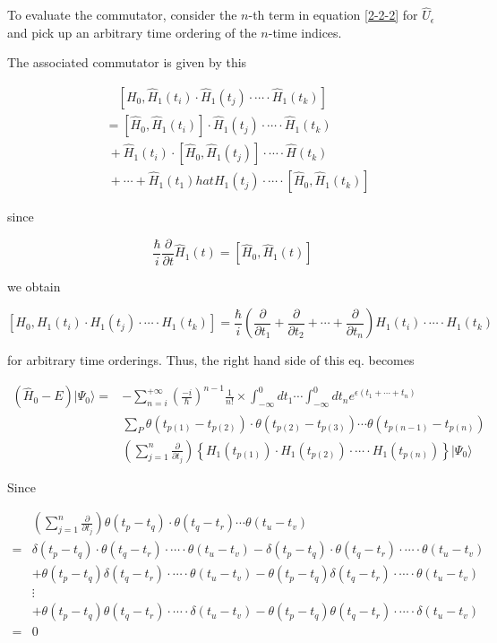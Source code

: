 To evaluate the commutator, consider the $n$-th term in equation \eqref{2-2-2} for $\hat{U}_\epsilon$ and pick up an arbitrary time ordering of the $n$-time indices. 

The associated commutator is given by this

\[\begin{split}
&\quad[H_0,\hat{H}_1(t_i)\cdot\hat{H}_1(t_j)\cdot\cdots\cdot\hat{H}_1(t_k)]\\
&=[\hat{H}_0,\hat{H}_1(t_i)]\cdot\hat{H}_1(t_j)\cdot\cdots\cdot\hat{H}_1(t_k)\\
&\ +\hat{H}_1(t_i)\cdot[\hat{H}_0,\hat{H}_1(t_j)]\cdot\cdots\cdot\hat{H}(t_k)\\
&\ +\cdots+\hat{H}_1(t_1)hat{H}_1(t_j)\cdot\cdots\cdot[\hat{H}_0,\hat{H}_1(t_k)]
\end{split}\]

since

\[\frac{\hbar}{i}\frac{\partial}{\partial t}\hat{H}_1(t)=[\hat{H}_0,\hat{H}_1(t)] \]

we obtain

\[[H_0,H_1(t_i)\cdot H_1(t_j) \cdot\cdots\cdot H_1(t_k)]=\frac{\hbar}{i}\left(\frac{\partial}{\partial t_1}+\frac{\partial}{\partial t_2}+\cdots+\frac{\partial}{\partial t_n}\right)H_1(t_i)\cdot\cdots\cdot H_1(t_k) \]

for arbitrary time orderings. Thus, the right hand side of this eq. becomes

\[\begin{split}
(\hat{H}_0-E)|\Psi_0\rangle =& -\sum_{n=i}^{+\infty}\left(\frac{-i}{\hbar}\right)^{n-1}\frac{1}{n!}\times\int_{-\infty}^0 dt_1\cdots\int_{-\infty}^0 dt_n e^{\epsilon(t_1+\cdots+t_n)}\\
&\sum_P\theta(t_{p(1)}-t_{p(2)})\cdot\theta(t_{p(2)}-t_{p(3)})\cdots\theta(t_{p(n-1)}-t_{p(n)})\\
&\left(\sum_{j=1}^n\frac{\partial}{\partial t_j}\right) \left\{H_1(t_{p(1)})\cdot H_1(t_{p(2)})\cdot\cdots\cdot H_1(t_{p(n)})\right\} |\Psi_0\rangle
\end{split}\]

Since

\[\begin{split}
&\left(\sum_{j=1}^n\frac{\partial}{\partial t_j}\right)\theta(t_p-t_q)\cdot\theta(t_q-t_r)\cdots\theta(t_u-t_v)\\
=&\delta(t_p-t_q)\cdot\theta(t_q-t_r)\cdot\cdots\cdot\theta(t_u-t_v)-\delta(t_p-t_q)\cdot\theta(t_q-t_r)\cdot\cdots\cdot\theta(t_u-t_v)\\
&+\theta(t_p-t_q)\delta(t_q-t_r)\cdot\cdots\cdot\theta(t_u-t_v)-\theta(t_p-t_q)\delta(t_q-t_r)\cdot\cdots\cdot\theta(t_u-t_v)\\
&\vdots\\
&+\theta(t_p-t_q)\theta(t_q-t_r)\cdot\cdots\cdot\delta(t_u-t_v)-\theta(t_p-t_q)\theta(t_q-t_r)\cdot\cdots\cdot\delta(t_u-t_v)\\
=&0
\end{split}\]

